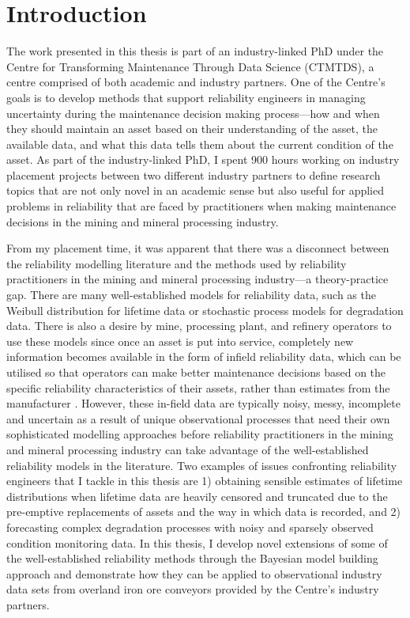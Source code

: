 \chapter{Introduction}\label{chap:chapter1}

The work presented in this thesis is part of an industry-linked PhD under the Centre for Transforming Maintenance Through Data Science (CTMTDS), a centre comprised of both academic and industry partners. One of the Centre's goals is to develop methods that support reliability engineers in managing uncertainty during the maintenance decision making process---how and when they should maintain an asset based on their understanding of the asset, the available data, and what this data tells them about the current condition of the asset. As part of the industry-linked PhD, I spent 900 hours working on industry placement projects between two different industry partners to define research topics that are not only novel in an academic sense but also useful for applied problems in reliability that are faced by practitioners when making maintenance decisions in the mining and mineral processing industry.

From my placement time, it was apparent that there was a disconnect between the reliability modelling literature and the methods used by reliability practitioners in the mining and mineral processing industry---a theory-practice gap. There are many well-established models for reliability data, such as the Weibull distribution \citep{weibull1951} for lifetime data or stochastic process models for degradation data. There is also a desire by mine, processing plant, and refinery operators to use these models since once an asset is put into service, completely new information becomes available in the form of infield reliability data, which can be utilised so that operators can make better maintenance decisions based on the specific reliability characteristics of their assets, rather than estimates from the manufacturer \citep{jardine2013}. However, these in-field data are typically noisy, messy, incomplete and uncertain as a result of unique observational processes that need their own sophisticated modelling approaches before reliability practitioners in the mining and mineral processing industry can take advantage of the well-established reliability models in the literature. Two examples of issues confronting reliability engineers that I tackle in this thesis are 1) obtaining sensible estimates of lifetime distributions when lifetime data are heavily censored and truncated due to the pre-emptive replacements of assets and the way in which data is recorded, and 2) forecasting complex degradation processes with noisy and sparsely observed condition monitoring data. In this thesis, I develop novel extensions of some of the well-established reliability methods through the Bayesian model building approach \citep{gelman_workflow_2020} and demonstrate how they can be applied to observational industry data sets from overland iron ore conveyors provided by the Centre's industry partners.

